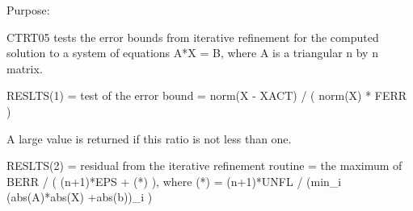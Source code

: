 \begin{DoxyParagraph}{Purpose\+: }
\begin{DoxyVerb} CTRT05 tests the error bounds from iterative refinement for the
 computed solution to a system of equations A*X = B, where A is a
 triangular n by n matrix.

 RESLTS(1) = test of the error bound
           = norm(X - XACT) / ( norm(X) * FERR )

 A large value is returned if this ratio is not less than one.

 RESLTS(2) = residual from the iterative refinement routine
           = the maximum of BERR / ( (n+1)*EPS + (*) ), where
             (*) = (n+1)*UNFL / (min_i (abs(A)*abs(X) +abs(b))_i )\end{DoxyVerb}
 
\end{DoxyParagraph}

